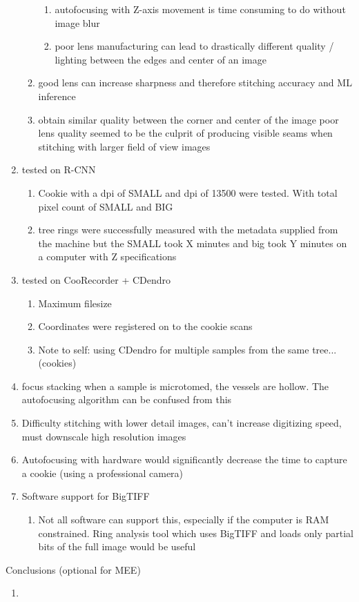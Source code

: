 \documentclass{article}
\begin{document}
\begin{outline}[enumerate]
\begin{enumerate}
\begin{enumerate}
\begin{enumerate}
				\item autofocusing with Z-axis movement is time consuming to do without image blur
				\item poor lens manufacturing can lead to drastically different quality / lighting between the edges and center of an image
				\end{enumerate}
			\item good lens can increase sharpness and therefore stitching accuracy and ML inference
			\item obtain similar quality between the corner and center of the image
			\subitem poor lens quality seemed to be the culprit of producing visible seams when stitching with larger field of view images 
			\end{enumerate}
		\item tested on R-CNN
			\begin {enumerate}
			\item Cookie with a dpi of SMALL and dpi of 13500 were tested. With total pixel count of SMALL and BIG
			\item tree rings were successfully measured with the metadata supplied from the machine but the SMALL took X minutes and big took Y minutes on a computer with Z specifications 
			\end {enumerate}
		\item tested on CooRecorder + CDendro
			\begin {enumerate}
			\item Maximum filesize 
			\item Coordinates were registered on to the cookie scans 
			\item Note to self: using CDendro for multiple samples from the same tree... (cookies) 
			\end {enumerate}
		\item focus stacking
		\subitem when a sample is microtomed, the vessels are hollow. The autofocusing algorithm can be confused from this 
		\item Difficulty stitching with lower detail images, can't increase digitizing speed, must downscale high resolution images 
		\item Autofocusing with hardware would significantly decrease the time to capture a cookie (using a professional camera)
		\item Software support for BigTIFF 
			\begin {enumerate}
			\item Not all software can support this, especially if the computer is RAM constrained. Ring analysis tool which uses BigTIFF and loads only partial bits of the full image would be useful
			\end {enumerate}
	\end{enumerate}
\item Conclusions (optional for MEE)
	\begin{enumerate}
	\item
	\end{enumerate}
        
\end{outline}
\end{document}

